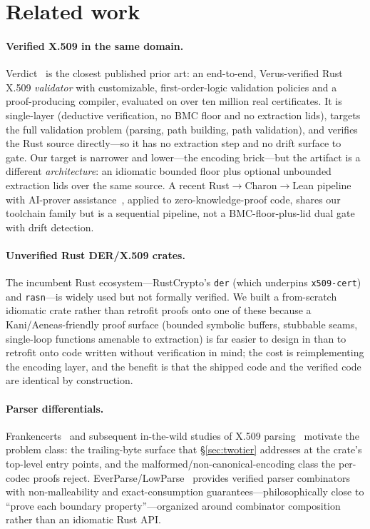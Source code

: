 \documentclass[10pt,twocolumn]{article}
\newcommand{\code}[1]{\texttt{\small #1}}
\begin{document}
\section{Related work}
\label{sec:related}

\paragraph{Verified X.509 in the same domain.}
Verdict~\cite{verdict} is the closest published prior art: an end-to-end,
Verus-verified Rust X.509 \emph{validator} with customizable, first-order-logic
validation policies and a proof-producing compiler, evaluated on over ten
million real certificates. It is single-layer (deductive verification, no BMC
floor and no extraction lids), targets the full validation problem
(parsing, path building, path validation), and verifies the Rust source
directly---so it has no extraction step and no drift surface to gate. Our
target is narrower and lower---the encoding brick---but the artifact is a
different \emph{architecture}: an idiomatic bounded floor plus optional
unbounded extraction lids over the same source. A recent
Rust${\to}$Charon${\to}$Lean pipeline with AI-prover assistance~\cite{ailpipeline},
applied to zero-knowledge-proof code, shares our toolchain family but is a
sequential pipeline, not a BMC-floor-plus-lid dual gate with drift detection.

\paragraph{Unverified Rust DER/X.509 crates.}
The incumbent Rust ecosystem---RustCrypto's \code{der} (which underpins
\code{x509-cert}) and \code{rasn}---is widely used but not formally verified.
We built a from-scratch idiomatic crate rather than retrofit proofs onto one of
these because a Kani/Aeneas-friendly proof surface (bounded symbolic buffers,
stubbable seams, single-loop functions amenable to extraction) is far easier to
design in than to retrofit onto code written without verification in mind; the
cost is reimplementing the encoding layer, and the benefit is that the shipped
code and the verified code are identical by construction.

\paragraph{Parser differentials.}
Frankencerts~\cite{frankencerts} and subsequent in-the-wild studies of X.509
parsing~\cite{parseval} motivate the problem class: the trailing-byte surface
that \S\ref{sec:twotier} addresses at the crate's top-level entry points, and
the malformed/non-canonical-encoding class the per-codec proofs reject.
EverParse/LowParse~\cite{everparse} provides verified parser combinators with
non-malleability and exact-consumption guarantees---philosophically close to
``prove each boundary property''---organized around combinator composition
rather than an idiomatic Rust API.
\end{document}
